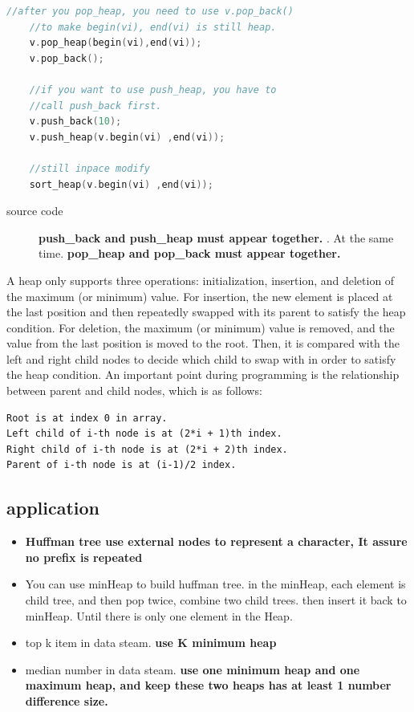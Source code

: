 \documentclass[a4paper,11pt,twoside]{book}
\begin{document}
\begin{itemize}
\begin{lstlisting}[frame=single, language=c++, mathescape=true]
	//after you pop_heap, you need to use v.pop_back()
	//to make begin(vi), end(vi) is still heap. 
	v.pop_heap(begin(vi),end(vi));
	v.pop_back();
	
	//if you want to use push_heap, you have to 
	//call push_back first. 
	v.push_back(10);
	v.push_heap(v.begin(vi) ,end(vi));
	
	//still inpace modify
	sort_heap(v.begin(vi) ,end(vi));
\end{lstlisting}
\begin{description}
	\item[source code] \textbf{push\_back and push\_heap must appear together. }. At the same time. \textbf{pop\_heap and pop\_back must appear together. }
\end{description}

A heap only supports three operations: initialization, insertion, and deletion of the maximum (or minimum) value. For insertion, the new element is placed at the last position and then repeatedly swapped with its parent to satisfy the heap condition. For deletion, the maximum (or minimum) value is removed, and the value from the last position is moved to the root. Then, it is compared with the left and right child nodes to decide which child to swap with in order to satisfy the heap condition. An important point during programming is the relationship between parent and child nodes, which is as follows:
\begin{lstlisting}
Root is at index 0 in array.
Left child of i-th node is at (2*i + 1)th index.
Right child of i-th node is at (2*i + 2)th index.
Parent of i-th node is at (i-1)/2 index.
\end{lstlisting}

\end{itemize}

\subsection{application}
\begin{itemize}
\item \textbf{Huffman tree use external nodes to represent a character, It assure no prefix is repeated }
\item You can use minHeap to build huffman tree. in the minHeap, each element is child tree, and then pop twice, combine two child trees. then insert it back to minHeap. Until there is only one element in the Heap. 

\item top k item in data steam. \textbf{use K minimum heap} 

\item median number in data steam. \textbf{use one minimum heap and one maximum heap, and keep these two heaps has at least 1 number difference size.} 
\end{itemize}
\end{document}
